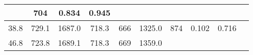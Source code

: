 \documentclass[a4paper,10pt]{article}
\begin{document}
\begin{longtable}{
     |
%    
    c|
%    
    c|
%    
    c|
%    
    c|
%    
    c|
%    
    c|
%    
    c|
%    
    c|
%    
    c|
%    
    c|
%    
    }
%        
        & 704
%        

%        

%        
        & 0.834
%        

%        

%        
        & 0.945
%        

%        
        \\
        \hline

        

%        

%        
        38.8
%        

%        

%        
        & 729.1
%        

%        

%        
        & 1687.0
%        

%        

%        
        & 718.3
%        

%        

%        
        & 666
%        

%        

%        
        & 1325.0
%        

%        

%        
        & 874
%        

%        

%        
        & 0.102
%        

%        

%        
        & 0.716
%        

%        
        \\
        \hline

        

%        

%        
        46.8
%        

%        

%        
        & 723.8
%        

%        

%        
        & 1689.1
%        

%        

%        
        & 718.3
%        

%        

%        
        & 669
%        

%        

%        
        & 1359.0
%        

%        


\end{longtable}
\end{document}
